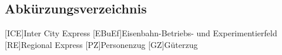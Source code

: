 \begin{acronym}[Bash]
\section*{Abkürzungsverzeichnis}
[ICE]{Inter City Express}
[EBuEf]{Eisenbahn-Betriebs- und Experimentierfeld}
[RE]{Regional Express}
[PZ]{Personenzug}
[GZ]{Güterzug}
\end{acronym}